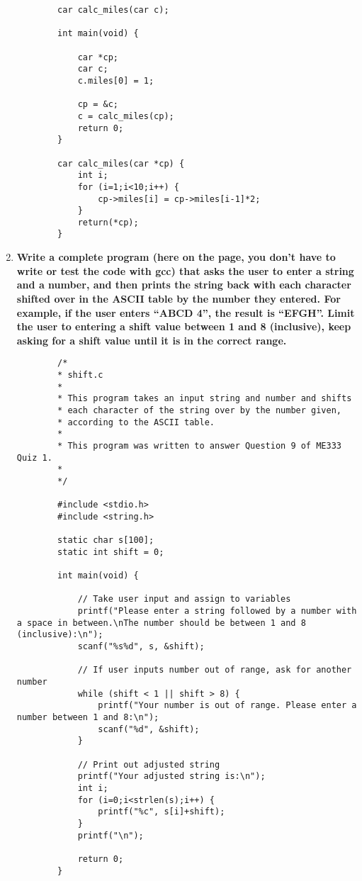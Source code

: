 \documentclass{article}
\begin{document}
\begin{enumerate}[label=\textbf{\arabic*})]
\begin{lstlisting}
        car calc_miles(car c);

        int main(void) {

            car *cp;
            car c;
            c.miles[0] = 1;

            cp = &c;
            c = calc_miles(cp);
            return 0;
        }

        car calc_miles(car *cp) {
            int i;
            for (i=1;i<10;i++) {
                cp->miles[i] = cp->miles[i-1]*2;
            }
            return(*cp);
        }
    \end{lstlisting}

    \item \textbf{Write a complete program (here on the page, you don’t have to write or test the code with gcc) 
    that asks the user to enter a string and a number, and then prints the string back with each 
    character shifted over in the ASCII table by the number they entered. For example, if the user 
    enters “ABCD 4”, the result is “EFGH”. Limit the user to entering a shift value between 1 and 8 
    (inclusive), keep asking for a shift value until it is in the correct range. } \\

    \begin{lstlisting}
        /*
        * shift.c
        *
        * This program takes an input string and number and shifts
        * each character of the string over by the number given, 
        * according to the ASCII table.  
        *
        * This program was written to answer Question 9 of ME333 Quiz 1.
        *
        */

        #include <stdio.h>
        #include <string.h>

        static char s[100];
        static int shift = 0;

        int main(void) {

            // Take user input and assign to variables
            printf("Please enter a string followed by a number with a space in between.\nThe number should be between 1 and 8 (inclusive):\n");
            scanf("%s%d", s, &shift);

            // If user inputs number out of range, ask for another number
            while (shift < 1 || shift > 8) {
                printf("Your number is out of range. Please enter a number between 1 and 8:\n");
                scanf("%d", &shift);
            }

            // Print out adjusted string
            printf("Your adjusted string is:\n");
            int i;
            for (i=0;i<strlen(s);i++) {
                printf("%c", s[i]+shift);
            }
            printf("\n");

            return 0;
        }


    \end{lstlisting}


\end{enumerate}
\end{document}
